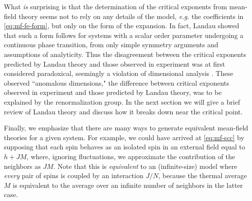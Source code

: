 What \emph{is} surprising is that the determination of the critical exponents
from mean-field theory seems not to rely on any details of the model,
\textit{e.g.} the coefficients in \cref{eq:mf-fe-form}, but only on the form
of the expansion. In fact, Landau showed that such a form follows for systems
with a scalar order parameter undergoing a continuous phase transition, from
only simple symmetry arguments and assumptions of analyticity. Thus the
disagreement between the critical exponents predicted by Landau theory and
those observed in experiment was at first considered paradoxical, seemingly a
violation of dimensional analysis \autocite{goldenfeld1992lectures}. These
observed ``anomalous dimensions," the difference between critical exponents
observed in experiment and those predicted by Landau theory, was to be
explained by the renormalization group. In the next section we will give a
brief review of Landau theory and discuss how it breaks down near the critical
point.

Finally, we emphasize that there are many ways to generate equivalent
mean-field theories for a given system. For example, we could have arrived at
\cref{eq:mf-scc} by supposing that each spin behaves as an isolated spin in an
external field equal to $h + J M$, where, ignoring fluctuations, we approximate
the contribution of the neighbors as $J M$. Note that this is \emph{equivalent}
to an (infinite-size) model where \emph{every} pair of spins is coupled by an
interaction $J/N$, because the thermal average $M$ is equivalent to the average
over an infinite number of neighbors in the latter case.

